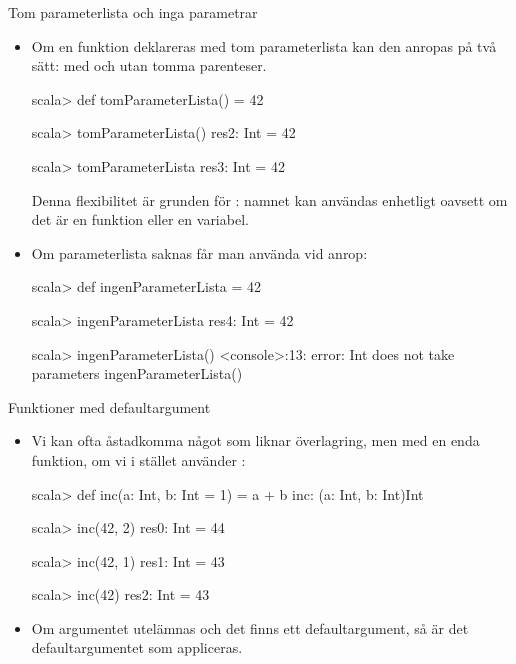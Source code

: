 \begin{Slide}{Tom parameterlista och inga parametrar}\SlideFontSmall
\begin{itemize}
\item Om en funktion deklareras med tom parameterlista \code{()} kan den anropas på två sätt: med och utan tomma parenteser.
\begin{REPL}
scala> def tomParameterLista() = 42

scala> tomParameterLista()
res2: Int = 42

scala> tomParameterLista
res3: Int = 42
\end{REPL}

Denna flexibilitet är grunden för : namnet kan användas enhetligt oavsett om det är en funktion eller en variabel.
\item Om parameterlista saknas får man  använda \code{()} vid anrop:

\begin{REPL}
scala> def ingenParameterLista = 42

scala> ingenParameterLista
res4: Int = 42

scala> ingenParameterLista()
<console>:13: error: Int does not take parameters
       ingenParameterLista()
\end{REPL}

\end{itemize}
\end{Slide}


\begin{Slide}{Funktioner med defaultargument}\SlideFontSmall

\begin{itemize}
\item Vi kan ofta åstadkomma något som liknar överlagring, men med en enda funktion, om vi i stället använder :
\begin{REPLnonum}
scala> def inc(a: Int, b: Int = 1) = a + b
inc: (a: Int, b: Int)Int

scala> inc(42, 2)
res0: Int = 44

scala> inc(42, 1)
res1: Int = 43

scala> inc(42)
res2: Int = 43

\end{REPLnonum}
\item Om argumentet utelämnas och det finns ett defaultargument, så är det defaultargumentet som appliceras.
\end{itemize}
\end{Slide}


